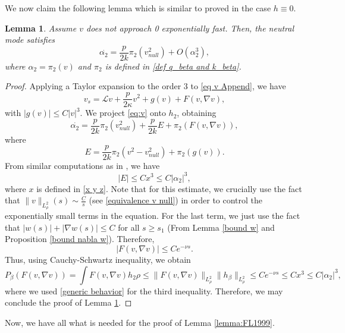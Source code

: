 \documentclass[11pt,a4paper]{article}
\newcommand{\1}{\mathbbm{1}}
\numberwithin{equation}{section}
\newtheorem{lemma}{Lemma}[section]
\theoremstyle{remark}
\begin{document}
We now claim the following lemma which is similar to \cite[Proposition 4.1]{FL1993} proved in the case $h\equiv 0$.
\begin{lemma}\label{lemma eq neutral modes}
Assume $v$ does not approach 0 exponentially fast. Then, the neutral mode  satisfies
\begin{equation}\label{eq alpha_2}
\overset{.}{\alpha_2}=\frac{p}{2k}\pi_2(v_{null}^2)+O\left(\alpha_2^{3}\right),
\end{equation}
where $\alpha_2=\pi_2(v)$ and $\pi_2$ is defined in \eqref{def q_beta and k_beta}.
\end{lemma}
\begin{proof}
Applying a Taylor expansion to the order 3 to \eqref{eq v Append}, we have
\begin{equation}
v_s=\mathcal{L}v+\frac{p}{2\kappa}v^2+g(v)+F(v,\nabla v),
\end{equation}
with $|g(v)|\leq C|v|^3$. We project \eqref{eq:v} onto $h_2$, obtaining
$$\overset{.}{\alpha_2}=\frac{p}{2k}\pi_2(v_{null}^2)+\frac{p}{2k}E+\pi_2(F(v,\nabla v)),$$
where
$$E=\frac{p}{2k}\pi_2(v^2-v_{null}^2)+\pi_2(g(v)).$$
From similar computations as in \cite[pages 334 and 335]{FL1993}, we have 
$$|E|\leq Cx^3\leq C |\alpha_2|^3,$$
where $x$ is defined in \eqref{x y z}. Note that for this estimate, we crucially use the fact that $\|v\|_{L^2_\rho}(s)\sim \frac{C}{s}$ (see \eqref{equivalence v null}) in order to control the exponentially small terms in the equation. For the last term, we just use the fact that $|w(s)|+|\nabla w(s)|\leq C$ for all $s\geq s_1$ (From Lemma \ref{bound w} and Proposition \ref{bound nabla w}). Therefore,
$$|F(v,\nabla v)|\leq Ce^{-\nu s}.$$
Thus, using Cauchy-Schwartz inequality, we obtain
$$P_\beta(F(v,\nabla v))=\int F(v,\nabla v)h_2\rho\leq \|F(v,\nabla v)\|_{L^2_\rho}\|h_\beta\|_{L^2_\rho} \leq Ce^{-\nu s}\leq C x^3\leq C |\alpha_2|^3,$$
where we used \eqref{generic behavior} for the third inequality. Therefore, we may conclude the proof of Lemma \ref{lemma eq neutral modes}.
\end{proof}
Now, we have all what is needed for the proof of Lemma \ref{lemma:FL1999}.
\end{document}
